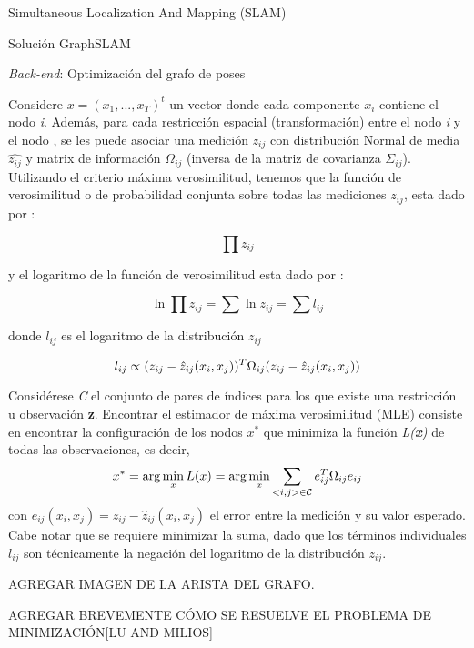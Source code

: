 \begin{subsection}{ Simultaneous Localization And Mapping (SLAM) }
\begin{subsection}{Solución GraphSLAM}
\begin{subsection}
{\textit{\textsl{Back-end}}: Optimización del grafo de poses}

Considere \textbf{$x = (x_{1}, ..., x_{T})^{t}$} un vector donde cada componente \textbf{$x_{i}$} contiene el nodo \textsl{i}. Además, para cada restricción espacial (transformación) entre el nodo \textsl{i} y el nodo , se les puede asociar una medición \textbf{$z_{ij}$} con distribución Normal de media \textbf{$\hat{z_{ij}}$} y matrix de información $\Omega_{ij}$ (inversa de la matriz de covarianza $\Sigma_{ij}$). \\
Utilizando el criterio máxima verosimilitud, tenemos que la función de verosimilitud o de probabilidad conjunta sobre todas las mediciones \textbf{$z_{ij}$}, esta dado por :

\begin{equation}
\textbf{$\prod{z_{ij}}$}
\end{equation}

y el logaritmo de la función de verosimilitud esta dado por : 

\begin{equation}
\textbf{$\ln \prod{z_{ij}} = \sum{\ln z_{ij}} = \sum{l_{ij}}$}
\end{equation}

donde \textbf{$l_{ij}$} es el logaritmo de la distribución \textbf{$z_{ij}$}

\begin{equation}
l_{ij} \propto \textbf{$ (z_{ij}-\hat{z}_{ij}(x_i,x_j))^{T}\Omega_{ij}(z_{ij}-\hat{z}_{ij}(x_i,x_j))$}
\end{equation}

Considérese \textsl{C} el conjunto de pares de índices para los que existe una restricción u observación \textbf{z}. Encontrar el estimador de máxima verosimilitud (MLE) consiste en encontrar la configuración de los nodos \textbf{$x^{*}$} que minimiza la función \textsl{L(\textbf{x})} de todas las observaciones, es decir, 
\begin{equation}
\textbf{$ x^* = \arg \min_{x} L(x) = \arg \min_{x} \sum_{<i,j>\in \mathcal{C}}e_{ij}^{T}\Omega_{ij}e_{ij} $}
\end{equation}
con \textbf{$ e_{ij}(x_{i},x_{j})=z_{ij}-\hat{z}_{ij}(x_{i},x_{j}) $} el error entre la medición y su valor esperado. 
Cabe notar que se requiere minimizar la suma, dado que los términos individuales $l_{ij}$ son técnicamente la negación del logaritmo de la distribución \textbf{$z_{ij}$}.

AGREGAR IMAGEN DE LA ARISTA DEL GRAFO.

AGREGAR BREVEMENTE CÓMO SE RESUELVE EL PROBLEMA DE MINIMIZACIÓN[LU AND MILIOS]

\end{subsection} %

\end{subsection} %

\end{subsection}

